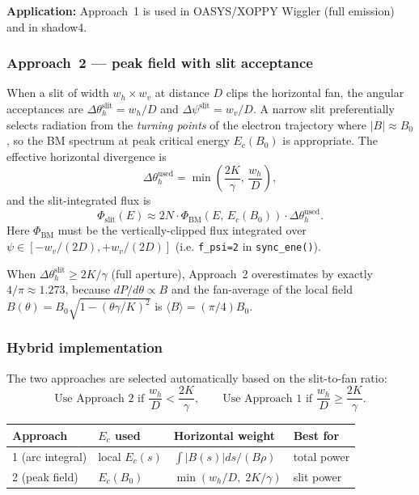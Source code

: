 \documentclass[11pt,a4paper]{article}
\begin{document}
\textbf{Application:} Approach~1 is used in OASYS/XOPPY Wiggler (full emission) and in
shadow4.

\subsubsection*{Approach~2 --- peak field with slit acceptance}

When a slit of width $w_h \times w_v$ at distance $D$ clips the horizontal fan, the
angular acceptances are $\Delta\theta_h^\text{slit} = w_h/D$ and
$\Delta\psi^\text{slit} = w_v/D$.  A narrow slit preferentially selects radiation from
the \emph{turning points} of the electron trajectory where $|B| \approx B_0$, so the
BM spectrum at peak critical energy $E_c(B_0)$ is appropriate.
The effective horizontal divergence is
\begin{equation}
  \Delta\theta_h^{\text{used}} = \min\!\left(\frac{2K}{\gamma},\,\frac{w_h}{D}\right),
  \label{eq:hdiv_used}
\end{equation}
and the slit-integrated flux is
\begin{equation}
  \Phi_{\text{slit}}(E) \approx 2N \cdot
    \Phi_\text{BM}\!\left(E,\,E_c(B_0)\right) \cdot \Delta\theta_h^{\text{used}}.
  \label{eq:approach2}
\end{equation}
Here $\Phi_\text{BM}$ must be the vertically-clipped flux integrated over $\psi \in [-w_v/(2D), +w_v/(2D)]$ (i.e. {\tt f\_psi=2} in {\tt sync\_ene()}).

When $\Delta\theta_h^\text{slit} \geq 2K/\gamma$ (full aperture), Approach~2
overestimates by exactly $4/\pi \approx 1.273$, because $dP/d\theta \propto B$
and the fan-average of the local field $B(\theta)=B_0\sqrt{1-(\theta \gamma / K)^2}$
is $\langle B\rangle = (\pi / 4) B_0$.

\subsubsection*{Hybrid implementation}

The two approaches are selected automatically based on the slit-to-fan ratio:
\begin{equation}
  \text{Use Approach~2 if } \frac{w_h}{D} < \frac{2K}{\gamma},
  \qquad
  \text{Use Approach~1 if } \frac{w_h}{D} \geq \frac{2K}{\gamma}.
  \label{eq:hybrid}
\end{equation}

\begin{center}
\begin{tabular}{llll}
\toprule
Approach & $E_c$ used & Horizontal weight & Best for  \\
\midrule
1 (arc integral) & local $E_c(s)$ & $\int|B(s)|ds/(B\rho)$ & total power  \\
2 (peak field)   & $E_c(B_0)$ & $\min(w_h/D,\;2K/\gamma)$ & slit power \\
\bottomrule
\end{tabular}
\end{center}
\end{document}
